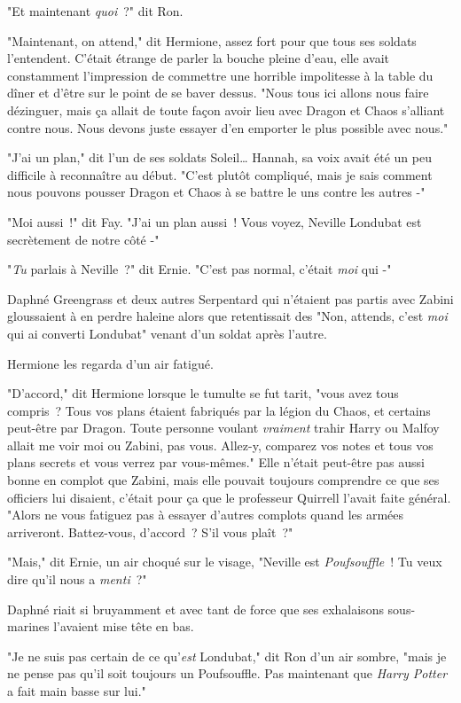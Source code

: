 "Et maintenant \emph{quoi}~?" dit Ron.

"Maintenant, on attend," dit Hermione, assez fort pour que tous ses soldats l'entendent. C'était étrange de parler la bouche pleine d'eau, elle avait constamment l'impression de commettre une horrible impolitesse à la table du dîner et d'être sur le point de se baver dessus. "Nous tous ici allons nous faire dézinguer, mais ça allait de toute façon avoir lieu avec Dragon et Chaos s'alliant contre nous. Nous devons juste essayer d'en emporter le plus possible avec nous."

"J'ai un plan," dit l'un de ses soldats Soleil… Hannah, sa voix avait été un peu difficile à reconnaître au début. "C'est plutôt compliqué, mais je sais comment nous pouvons pousser Dragon et Chaos à se battre le uns contre les autres -"

"Moi aussi~!" dit Fay. "J'ai un plan aussi~! Vous voyez, Neville Londubat est secrètement de notre côté -"

"\emph{Tu} parlais à Neville~?" dit Ernie. "C'est pas normal, c'était \emph{moi} qui -"

Daphné Greengrass et deux autres Serpentard qui n'étaient pas partis avec Zabini gloussaient à en perdre haleine alors que retentissait des "Non, attends, c'est \emph{moi} qui ai converti Londubat" venant d'un soldat après l'autre.

Hermione les regarda d'un air fatigué.

"D'accord," dit Hermione lorsque le tumulte se fut tarit, "vous avez tous compris~? Tous vos plans étaient fabriqués par la légion du Chaos, et certains peut-être par Dragon. Toute personne voulant \emph{vraiment} trahir Harry ou Malfoy allait me voir moi ou Zabini, pas vous. Allez-y, comparez vos notes et tous vos plans secrets et vous verrez par vous-mêmes." Elle n'était peut-être pas aussi bonne en complot que Zabini, mais elle pouvait toujours comprendre ce que ses officiers lui disaient, c'était pour ça que le professeur Quirrell l'avait faite général. "Alors ne vous fatiguez pas à essayer d'autres complots quand les armées arriveront. Battez-vous, d'accord~? S'il vous plaît~?"

"Mais," dit Ernie, un air choqué sur le visage, "Neville est \emph{Poufsouffle}~! Tu veux dire qu'il nous a \emph{menti}~?"

Daphné riait si bruyamment et avec tant de force que ses exhalaisons sous-marines l'avaient mise tête en bas.

"Je ne suis pas certain de ce qu'\emph{est} Londubat," dit Ron d'un air sombre, "mais je ne pense pas qu'il soit toujours un Poufsouffle. Pas maintenant que \emph{Harry Potter} a fait main basse sur lui."

